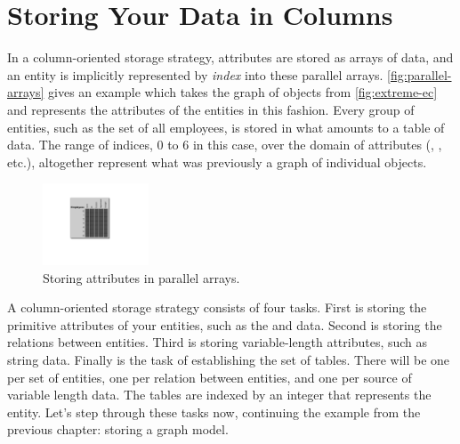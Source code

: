 
\section{Storing Your Data in Columns}
\label{sec:column-oriented}

In a column-oriented storage strategy, attributes are stored as arrays of data,
and an entity is implicitly represented by \emph{index} into these parallel
arrays. \autoref{fig:parallel-arrays} gives an example which takes the graph of
objects from \autoref{fig:extreme-ec} and represents the attributes of the
 entities in this fashion. Every group of entities, such as the
set of all employees, is stored in what amounts to a table of data. The range of
indices, 0 to 6 in this case, over the domain of attributes (,
, etc.), altogether represent what was previously a graph of
individual objects.


\begin{figure}
\centering
\vspace{-5mm}
   \includegraphics[width=0.28\textwidth]{part3/Figures/extreme/EC-example-for-columns2}
   \caption{Storing attributes in parallel arrays.}
   \label{fig:parallel-arrays}
\end{figure}
A column-oriented storage strategy consists of four tasks. First is storing the
primitive attributes of your entities, such as the  and
 data. Second is storing the relations between entities. Third is
storing variable-length attributes, such as string data. Finally is the task of
establishing the set of tables. There will be one per set of entities, one per relation between
entities, and one per source of variable length data. The tables are indexed by
an integer that represents the entity. Let's step through these tasks now,
continuing the example from the previous chapter: storing a graph model.

